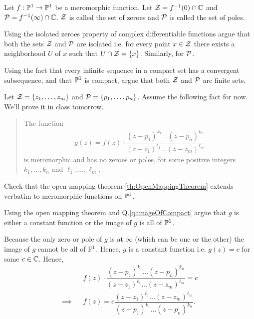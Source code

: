 \documentclass{article}
\begin{document}
    Let $f: \mathbb{P}^1 \rightarrow \mathbb{P}^1$ be a meromorphic function.
    Let $\mathcal{Z} = f^{-1}(0) \cap \mathbb{C}$ and $\mathcal{P} = f^{-1}(\infty) \cap \mathbb{C}$. $\mathcal{Z}$ is called the set of zeroes and $\mathcal{P}$ is called the set of poles.
    \begin{qbox}
      Using the isolated zeroes property of complex differentiable functions argue that both the sets $\mathcal{Z}$ and $\mathcal{P}$ are isolated i.e. for every point $x \in \mathcal{Z}$ there exists a neighborhood  $U$ of $x$ such that $U \cap \mathcal{Z} = \left\{x\right\}$. Similarly, for $\mathcal{P}$.
    \end{qbox}
    \begin{qbox}
      Using the fact that every infinite sequence in a compact set has a convergent subsequence, and that $\mathbb{P}^1$ is compact, argue that both $\mathcal{Z}$ and $\mathcal{P}$ are finite sets.
    \end{qbox}
    Let $\mathcal{Z} = \left\{z_1, \dots, z_m\right\}$ and $\mathcal{P} = \left\{p_1, \dots, p_n\right\}$.
    Assume the following fact for now. We'll prove it in class tomorrow.
    \begin{quote}
      The function
      \begin{align*}
        g(z) = f(z) \cdot \dfrac{(z-p_1)^{k_1} \dots (z-p_n)^{k_n}}{(z-z_1)^{\ell_1} \dots (z-z_m)^{\ell_m}}
      \end{align*}
      is meromorphic and has no zeroes or poles, for some positive integers $k_1, \dots, k_n$ and $\ell_1, \dots, \ell_m$.
    \end{quote}
    \begin{qbox}
      Check that the open mapping theorem \ref{th:OpenMappingTheorem} extends verbatim to meromorphic functions on $\mathbb{P}^1$.
    \end{qbox}
    \begin{qbox}
      Using the open mapping theorem and Q.\ref{q:imageOfCompact} argue that $g$ is either a constant function or the image of $g$ is all of $\mathbb{P}^1$.
    \end{qbox}
    Because the only zero or pole of $g$ is at $\infty$ (which can be one or the other) the image of $g$ cannot be all of $\mathbb{P}^1$. Hence, $g$ is a constant function i.e. $g(z) = c$ for some $c \in \mathbb{C}$. Hence,
    \begin{align*}
      &&
      f(z) \cdot \dfrac{(z-p_1)^{k_1} \dots (z-p_n)^{k_n}}{(z-z_1)^{\ell_1} \dots (z-z_m)^{\ell_m}}
      = c \\
      \implies
      &&
      f(z) = c\dfrac{(z-z_1)^{\ell_1} \dots (z-z_m)^{\ell_m}}{(z-p_1)^{k_1} \dots (z-p_n)^{k_n}}.
    \end{align*}
\end{document}
